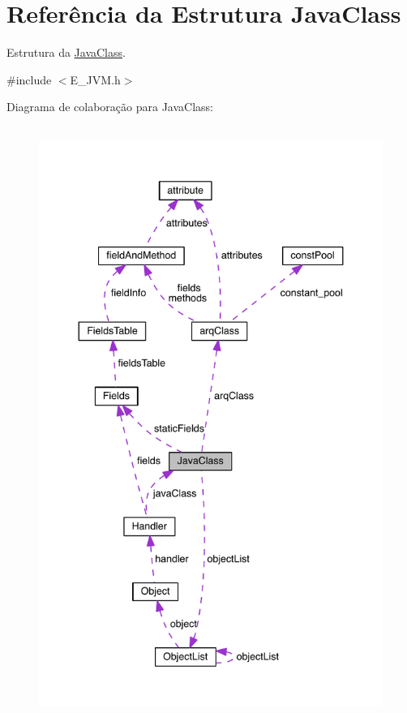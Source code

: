 \hypertarget{struct_java_class}{}\section{Referência da Estrutura Java\+Class}
\label{struct_java_class}


Estrutura da \hyperlink{struct_java_class}{Java\+Class}.  




{\ttfamily \#include $<$E\+\_\+\+J\+V\+M.\+h$>$}



Diagrama de colaboração para Java\+Class\+:\nopagebreak
\begin{figure}[H]
\begin{center}
\leavevmode
\includegraphics[height=550pt]{struct_java_class__coll__graph}
\end{center}
\end{figure}
